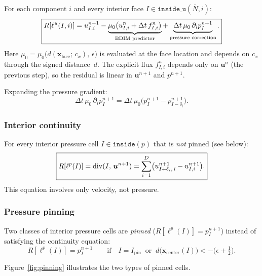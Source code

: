 \documentclass[11pt]{article}
\newcommand{\vect}[1]{\bm{#1}}
\begin{document}
For each component $i$ and every interior face
$I\in\texttt{inside\_u}(\bar N, i)$:
\begin{equation}\label{eq:res_mom}
  \boxed{%
  R[\ell^{u}(I,i)]
  = u^{n+1}_{I,i}
  - \underbrace{\mu_0\bigl(u^n_{I,i} + \Delta t\,f^n_{I,i}\bigr)}_{\text{BDIM predictor}}
  + \underbrace{\Delta t\,\mu_0\,\partial_i p^{n+1}_I}_{\text{pressure correction}}.}
\end{equation}
Here $\mu_0 = \mu_0\bigl(d(\vect{x}_{\mathrm{face}};\,c_x),\,\epsilon\bigr)$
is evaluated at the face location and depends on $c_x$ through the signed
distance~$d$.  The explicit flux $f^n_{I,i}$ depends only on
$\vect{u}^{n}$ (the previous step), so the residual is linear in
$\vect{u}^{n+1}$ and $p^{n+1}$.

Expanding the pressure gradient:
\begin{equation}
  \Delta t\,\mu_0\,\partial_i p^{n+1}_I
  = \Delta t\,\mu_0\bigl(p^{n+1}_I - p^{n+1}_{I-\delta_i}\bigr).
\end{equation}

\subsubsection{Interior continuity}

For every interior pressure cell $I\in\texttt{inside}(p)$ that is
\emph{not} pinned (see below):
\begin{equation}\label{eq:res_cont}
  \boxed{%
  R[\ell^{p}(I)] = \operatorname{div}(I,\,\vect{u}^{n+1})
  = \sum_{i=1}^{D}\bigl(u^{n+1}_{I+\delta_i,\,i} - u^{n+1}_{I,i}\bigr).}
\end{equation}
This equation involves only velocity, not pressure.

\subsubsection{Pressure pinning}

Two classes of interior pressure cells are \emph{pinned}
($R[\ell^{p}(I)] = p^{n+1}_I$) instead of satisfying
the continuity equation:
\begin{equation}\label{eq:res_pin}
  \boxed{R[\ell^{p}(I)] = p^{n+1}_{I}}
  \qquad\text{if}\quad
  I = I_{\mathrm{pin}}
  \;\;\text{or}\;\;
  d\bigl(\vect{x}_{\mathrm{center}}(I)\bigr) < -\bigl(\epsilon + \tfrac{1}{2}\bigr).
\end{equation}

Figure~\ref{fig:pinning} illustrates the two types of pinned cells.
\end{document}
